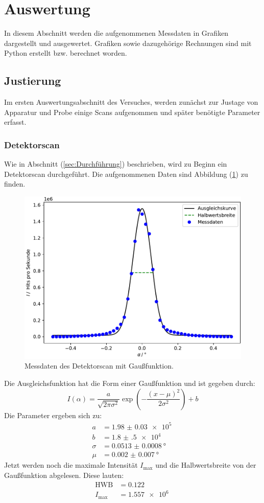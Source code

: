 \newpage
\section{Auswertung}
\label{sec:Auswertung}
In diesem Abschnitt werden die aufgenommenen Messdaten in Grafiken dargestellt und ausgewertet. Grafiken sowie dazugehörige Rechnungen sind mit Python \cite{python} erstellt bzw. berechnet worden.
\subsection{Justierung}
Im ersten Auswertungsabschnitt des Versuches, werden zunächst zur Justage von Apparatur und Probe einige Scans aufgenommen und später benötigte Parameter erfasst.
\subsubsection{Detektorscan}
Wie in Abschnitt (\ref{sec:Durchführung}) beschrieben, wird zu Beginn ein Detektorscan durchgeführt. Die aufgenommenen Daten sind Abbildung (\ref{fig:detekscan}) zu finden.
\begin{figure}[h!]
  \centering
  \includegraphics[scale=0.7]{fig/plot_detektorscan.pdf}
  \caption{Messdaten des Detektorscan mit Gaußfunktion.}
  \label{fig:detekscan}
\end{figure}
Die Ausgleichsfunktion hat die Form einer Gaußfunktion und ist gegeben durch:
\begin{equation}
  \label{eqn:detektor}
  I(\alpha)=\dfrac{a}{\sqrt{2\pi\sigma^2}}\exp\left(-\dfrac{(x-\mu)^2}{2\sigma^2}\right)+b
\end{equation}
Die Parameter ergeben sich zu:
\begin{align*}
  a &= \SI{1.98(3) e5}{} \\
  b &= \SI{1.8(5) e4}{} \\
  \sigma &= \SI{0.0513(8)}{\degree} \\
  \mu &= \SI{0.002(7)}{\degree}
\end{align*}
Jetzt werden noch die maximale Intensität $I_\mathrm{max}$ und die Halbwertsbreite von der Gaußfunktion abgelesen. Diese lauten:
\begin{align*}
  \mathrm{HWB}&=0.122 \\
  I_\mathrm{max}&=\SI{1.557 e6}{}
\end{align*}
